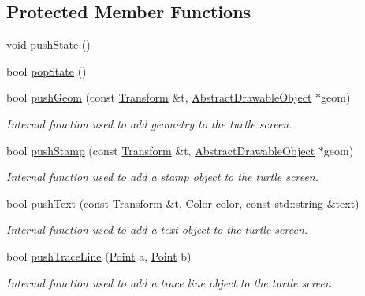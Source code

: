\subsection*{Protected Member Functions}
\begin{DoxyCompactItemize}
\item 
void \hyperlink{classcturtle_1_1Turtle_a5e602612caf63a1e2778b7c700cb7579}{push\+State} ()
\item 
bool \hyperlink{classcturtle_1_1Turtle_a5c30156bce0af41ff3d66ecb30017dff}{pop\+State} ()
\item 
bool \hyperlink{classcturtle_1_1Turtle_a68ea497f0c865e812026d861882a1c1a}{push\+Geom} (const \hyperlink{classcturtle_1_1Transform}{Transform} \&t, \hyperlink{classcturtle_1_1AbstractDrawableObject}{Abstract\+Drawable\+Object} $\ast$geom)
\begin{DoxyCompactList}\small\item\em Internal function used to add geometry to the turtle screen. \end{DoxyCompactList}\item 
bool \hyperlink{classcturtle_1_1Turtle_a7bcfb1444531cfb43bf51e9b1b94793b}{push\+Stamp} (const \hyperlink{classcturtle_1_1Transform}{Transform} \&t, \hyperlink{classcturtle_1_1AbstractDrawableObject}{Abstract\+Drawable\+Object} $\ast$geom)
\begin{DoxyCompactList}\small\item\em Internal function used to add a stamp object to the turtle screen. \end{DoxyCompactList}\item 
bool \hyperlink{classcturtle_1_1Turtle_a5c6d5684bd6fb11e291576a5c55c2dbf}{push\+Text} (const \hyperlink{classcturtle_1_1Transform}{Transform} \&t, \hyperlink{classcturtle_1_1Color}{Color} color, const std\+::string \&text)
\begin{DoxyCompactList}\small\item\em Internal function used to add a text object to the turtle screen. \end{DoxyCompactList}\item 
bool \hyperlink{classcturtle_1_1Turtle_a5ea16e46b1220ea6afb0d40abecbec17}{push\+Trace\+Line} (\hyperlink{structcturtle_1_1ivec2}{Point} a, \hyperlink{structcturtle_1_1ivec2}{Point} b)
\begin{DoxyCompactList}\small\item\em Internal function used to add a trace line object to the turtle screen. \end{DoxyCompactList}\item 

\end{DoxyCompactItemize}
